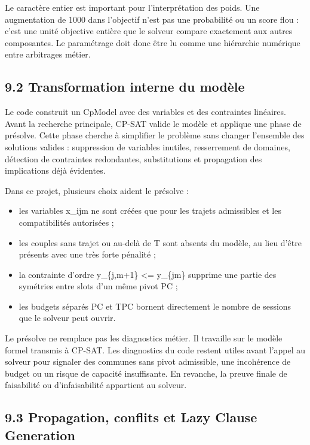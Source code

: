 \documentclass[11pt,a4paper]{article}
\begin{document}
Le caractère entier est important pour l'interprétation des poids. Une augmentation de 1000 dans l'objectif n'est pas une probabilité ou un score flou : c'est une unité objective entière que le solveur compare exactement aux autres composantes. Le paramétrage doit donc être lu comme une hiérarchie numérique entre arbitrages métier.

\subsection{9.2 Transformation interne du modèle}

Le code construit un CpModel avec des variables et des contraintes linéaires. Avant la recherche principale, CP-SAT valide le modèle et applique une phase de présolve. Cette phase cherche à simplifier le problème sans changer l'ensemble des solutions valides : suppression de variables inutiles, resserrement de domaines, détection de contraintes redondantes, substitutions et propagation des implications déjà évidentes.

Dans ce projet, plusieurs choix aident le présolve :

\begin{itemize}
\item les variables x\_ijm ne sont créées que pour les trajets admissibles et les
compatibilités autorisées ;

\item les couples sans trajet ou au-delà de T sont absents du modèle, au lieu d'être
présents avec une très forte pénalité ;

\item la contrainte d'ordre y\_\{j,m+1\} <= y\_\{jm\} supprime une partie des symétries
entre slots d'un même pivot PC ;

\item les budgets séparés PC et TPC bornent directement le nombre de sessions que le
solveur peut ouvrir.

\end{itemize}

Le présolve ne remplace pas les diagnostics métier. Il travaille sur le modèle formel transmis à CP-SAT. Les diagnostics du code restent utiles avant l'appel au solveur pour signaler des communes sans pivot admissible, une incohérence de budget ou un risque de capacité insuffisante. En revanche, la preuve finale de faisabilité ou d'infaisabilité appartient au solveur.

\subsection{9.3 Propagation, conflits et Lazy Clause Generation}
\end{document}

